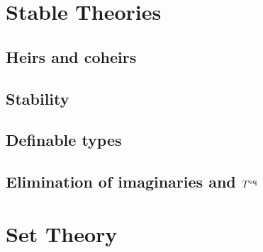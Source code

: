 \documentclass[11pt]{article}
\begin{document}
\section{Stable Theories}
\label{sec:orgeb2f037}
\subsection{Heirs and coheirs}
\label{sec:org66b733c}
\subsection{Stability}
\label{sec:org8571335}
\subsection{Definable types}
\label{sec:orgc04bc6f}
\subsection{Elimination of imaginaries and \texorpdfstring{\(T^{\operatorname{eq}}\)}{Teq}}
\label{sec:org5ea6da5}





\appendix
\section{Set Theory}
\label{sec:org29d90d1}
\end{document}
